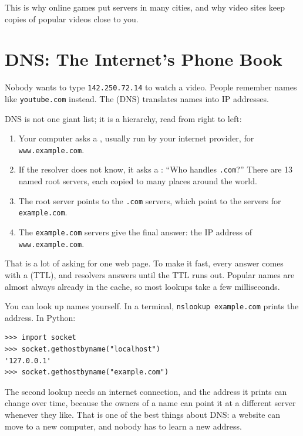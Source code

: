 This is why online games put servers in many cities, and why video sites keep copies of popular videos close
to you.

\section{DNS: The Internet's Phone Book}
Nobody wants to type \verb|142.250.72.14| to watch a video. People remember names like \verb|youtube.com|
instead. The  (DNS) translates names into IP addresses.

DNS is not one giant list; it is a hierarchy, read from right to left:
\begin{enumerate}
\item Your computer asks a , usually run by your internet provider, for
\verb|www.example.com|.
\item If the resolver does not know, it asks a : ``Who handles \verb|.com|?'' There are
13 named root servers, each copied to many places around the world.
\item The root server points to the \verb|.com| servers, which point to the servers for \verb|example.com|.
\item The \verb|example.com| servers give the final answer: the IP address of \verb|www.example.com|.
\end{enumerate}

That is a lot of asking for one web page. To make it fast, every answer comes with a 
(TTL), and resolvers  answers until the TTL runs out. Popular names are almost always already
in the cache, so most lookups take a few milliseconds.

You can look up names yourself. In a terminal, \verb|nslookup example.com| prints the address. In Python:

\begin{verbatim}
>>> import socket
>>> socket.gethostbyname("localhost")
'127.0.0.1'
>>> socket.gethostbyname("example.com")
\end{verbatim}

The second lookup needs an internet connection, and the address it prints can change over time, because the
owners of a name can point it at a different server whenever they like. That is one of the best things about
DNS: a website can move to a new computer, and nobody has to learn a new address.

